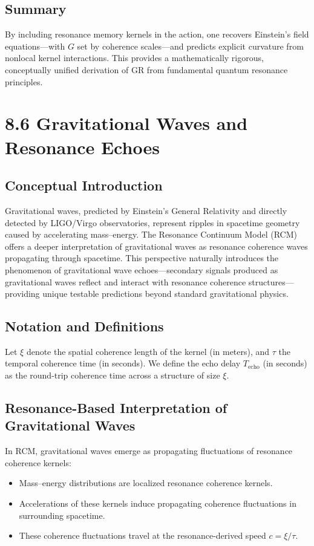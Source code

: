\subsection{Summary}

By including resonance memory kernels in the action, one recovers Einstein’s field equations—with \(G\) set by coherence scales—and predicts explicit curvature from nonlocal kernel interactions. This provides a mathematically rigorous, conceptually unified derivation of GR from fundamental quantum resonance principles.

\section{8.6 Gravitational Waves and Resonance Echoes}

\subsection{Conceptual Introduction}

Gravitational waves, predicted by Einstein's General Relativity and directly detected by LIGO/Virgo observatories, represent ripples in spacetime geometry caused by accelerating mass–energy. The Resonance Continuum Model (RCM) offers a deeper interpretation of gravitational waves as resonance coherence waves propagating through spacetime. This perspective naturally introduces the phenomenon of gravitational wave echoes—secondary signals produced as gravitational waves reflect and interact with resonance coherence structures—providing unique testable predictions beyond standard gravitational physics.

\subsection{Notation and Definitions}

Let \(\xi\) denote the spatial coherence length of the kernel (in meters), and \(\tau\) the temporal coherence time (in seconds). We define the echo delay \(T_{\mathrm{echo}}\) (in seconds) as the round-trip coherence time across a structure of size \(\xi\).

\subsection{Resonance-Based Interpretation of Gravitational Waves}

In RCM, gravitational waves emerge as propagating fluctuations of resonance coherence kernels:
\begin{itemize}
  \item Mass–energy distributions are localized resonance coherence kernels.
  \item Accelerations of these kernels induce propagating coherence fluctuations in surrounding spacetime.
  \item These coherence fluctuations travel at the resonance-derived speed \(c = \xi/\tau\).
\end{itemize}

